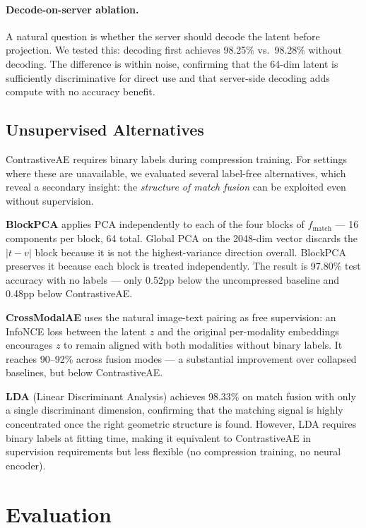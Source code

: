 \documentclass[10pt,twocolumn]{article}
\begin{document}
\paragraph{Decode-on-server ablation.}
A natural question is whether the server should decode the latent before
projection. We tested this: decoding first achieves 98.25\% vs.\ 98.28\%
without decoding. The difference is within noise, confirming that the
64-dim latent is sufficiently discriminative for direct use and that
server-side decoding adds compute with no accuracy benefit.

\subsection{Unsupervised Alternatives}

ContrastiveAE requires binary labels during compression training.
For settings where these are unavailable, we evaluated several label-free
alternatives, which reveal a secondary insight: the \emph{structure of
match fusion} can be exploited even without supervision.

\textbf{BlockPCA} applies PCA independently to each of the four blocks
of $f_\text{match}$ --- 16 components per block, 64 total. Global PCA
on the 2048-dim vector discards the $|t{-}v|$ block because it is not the
highest-variance direction overall. BlockPCA preserves it because each
block is treated independently. The result is 97.80\% test accuracy
with no labels --- only 0.52pp below the uncompressed baseline and 0.48pp
below ContrastiveAE.

\textbf{CrossModalAE} uses the natural image-text pairing as free
supervision: an InfoNCE loss between the latent $z$ and the original
per-modality embeddings encourages $z$ to remain aligned with both
modalities without binary labels. It reaches 90--92\% across fusion
modes --- a substantial improvement over collapsed baselines, but below
ContrastiveAE.

\textbf{LDA} (Linear Discriminant Analysis) achieves 98.33\% on match
fusion with only a single discriminant dimension, confirming that the
matching signal is highly concentrated once the right geometric structure
is found. However, LDA requires binary labels at fitting time, making it
equivalent to ContrastiveAE in supervision requirements but less
flexible (no compression training, no neural encoder).


\section{Evaluation}
\label{sec:eval}
\end{document}

